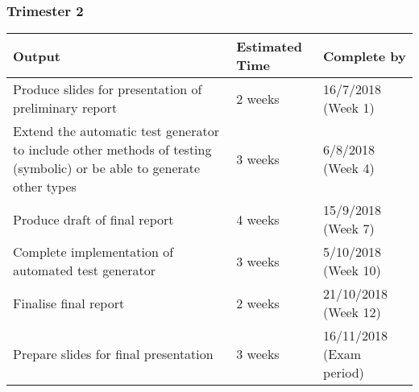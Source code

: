 \documentclass[11pt, a4paper, twoside, openright]{report}
\begin{document}
\subsubsection*{Trimester 2}
\begin{tabular}{ |p{10cm}|p{3cm}|p{2cm}| }
	\hline
	\textbf{Output} & \textbf{Estimated Time} & \textbf{Complete by}\\
	\hline
	Produce slides for presentation of preliminary report & 2 weeks & 16/7/2018 (Week 1)\\
	\hline
	Extend the automatic test generator to include other methods of testing (symbolic) or be able to generate other types & 3 weeks & 6/8/2018 (Week 4)\\
	\hline
	Produce draft of final report & 4 weeks & 15/9/2018 (Week 7)\\
	\hline
	Complete implementation of automated test generator & 3 weeks & 5/10/2018 (Week 10) \\
	\hline
	Finalise final report & 2 weeks & 21/10/2018 (Week 12) \\
	\hline
	Prepare slides for final presentation & 3 weeks & 16/11/2018 (Exam period)\\
	\hline
\end{tabular}
\end{document}
